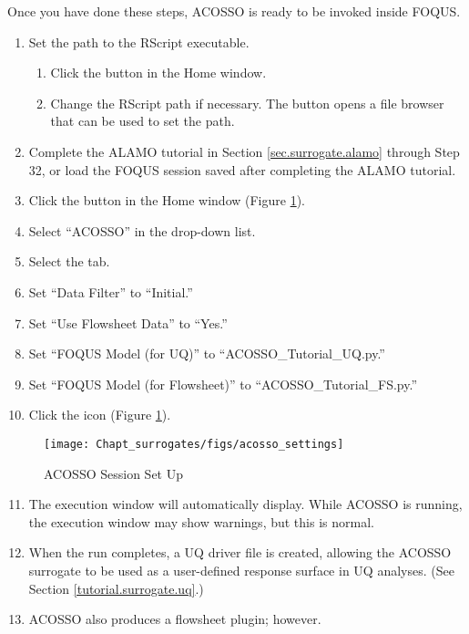 Once you have done these steps, ACOSSO is ready to be invoked inside FOQUS.

\begin{enumerate}
	\item{Set the path to the RScript executable.}
		\begin{enumerate}
			\item Click the  button in the Home window.
			\item Change the RScript path if necessary. The  button
           opens a file browser that can be used to set the path.
		\end{enumerate}
	\item Complete the ALAMO tutorial in Section \ref{sec.surrogate.alamo} through Step 32, or load the FOQUS session saved after completing the ALAMO tutorial.
	\item Click the  button in the Home window (Figure \ref{fig.acosso.settings}).
	\item Select ``ACOSSO'' in the  drop-down list.
	\item Select the  tab.
	\item Set ``Data Filter'' to ``Initial.''
	\item Set ``Use Flowsheet Data'' to ``Yes.''
	\item Set ``FOQUS Model (for UQ)'' to ``ACOSSO\_Tutorial\_UQ.py.''
	\item Set ``FOQUS Model (for Flowsheet)'' to ``ACOSSO\_Tutorial\_FS.py.''
	\item Click the  icon (Figure \ref{fig.acosso.settings}).
\end{enumerate}

\begin{figure}[H]
	\begin{center}
		\texttt{[image: Chapt\_surrogates/figs/acosso\_settings]}
		\caption{ACOSSO Session Set Up}
		\label{fig.acosso.settings}
	\end{center}
\end{figure}

\begin{enumerate}
	\setcounter{enumi}{10}
	\item The execution window will automatically display. While ACOSSO is
     running, the execution window may show warnings, but this is normal.
	\item When the run completes, a UQ driver file is created, allowing the
     ACOSSO surrogate to be used as a user-defined response surface in UQ
     analyses. (See Section \ref{tutorial.surrogate.uq}.)
	\item ACOSSO also produces a flowsheet plugin; however.
\end{enumerate}


